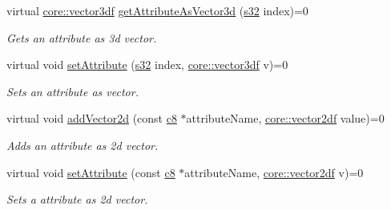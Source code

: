 \begin{DoxyCompactItemize}
virtual \hyperlink{namespaceirr_1_1core_a06f169d08b5c429f5575acb7edbad811}{core\+::vector3df} \hyperlink{classirr_1_1io_1_1IAttributes_a7ff94072381cac9912d73c9c6c77c6ce}{get\+Attribute\+As\+Vector3d} (\hyperlink{namespaceirr_ac66849b7a6ed16e30ebede579f9b47c6}{s32} index)=0
\begin{DoxyCompactList}\small\item\em Gets an attribute as 3d vector. \end{DoxyCompactList}\item 
\mbox{\label{classirr_1_1io_1_1IAttributes_ac042bda6760e9adcfd967b0046d55d20}} 
virtual void \hyperlink{classirr_1_1io_1_1IAttributes_ac042bda6760e9adcfd967b0046d55d20}{set\+Attribute} (\hyperlink{namespaceirr_ac66849b7a6ed16e30ebede579f9b47c6}{s32} index, \hyperlink{namespaceirr_1_1core_a06f169d08b5c429f5575acb7edbad811}{core\+::vector3df} v)=0
\begin{DoxyCompactList}\small\item\em Sets an attribute as vector. \end{DoxyCompactList}\item 
\mbox{\label{classirr_1_1io_1_1IAttributes_a515026d0bfa5c984cb2b0799b9468803}} 
virtual void \hyperlink{classirr_1_1io_1_1IAttributes_a515026d0bfa5c984cb2b0799b9468803}{add\+Vector2d} (const \hyperlink{namespaceirr_a9395eaea339bcb546b319e9c96bf7410}{c8} $\ast$attribute\+Name, \hyperlink{namespaceirr_1_1core_a2cf08556d77f6f5a792973a6e27ed11b}{core\+::vector2df} value)=0
\begin{DoxyCompactList}\small\item\em Adds an attribute as 2d vector. \end{DoxyCompactList}\item 
\mbox{\label{classirr_1_1io_1_1IAttributes_a51c9f7fbc0d26fd4123a5cf3d6059f4d}} 
virtual void \hyperlink{classirr_1_1io_1_1IAttributes_a51c9f7fbc0d26fd4123a5cf3d6059f4d}{set\+Attribute} (const \hyperlink{namespaceirr_a9395eaea339bcb546b319e9c96bf7410}{c8} $\ast$attribute\+Name, \hyperlink{namespaceirr_1_1core_a2cf08556d77f6f5a792973a6e27ed11b}{core\+::vector2df} v)=0
\begin{DoxyCompactList}\small\item\em Sets a attribute as 2d vector. \end{DoxyCompactList}\item 

\end{DoxyCompactItemize}
